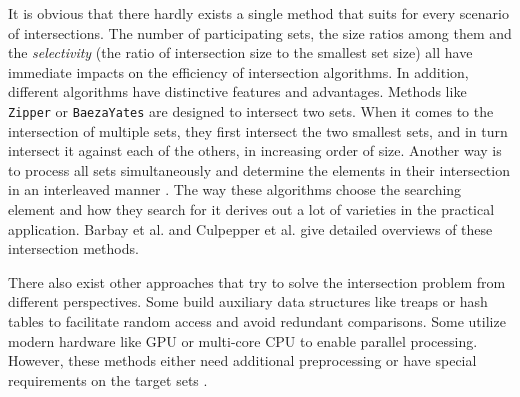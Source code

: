 It is obvious that there hardly exists a single method that suits for every scenario of intersections.
The number of participating sets, the size ratios among them and the \textit{selectivity} (the ratio of intersection size to the smallest set size) all have immediate impacts on the efficiency of intersection algorithms.
In addition, different algorithms have distinctive features and advantages.
Methods like \texttt{Zipper} or \texttt{BaezaYates} \cite{Baeza2010Fast} are designed to intersect two sets.
When it comes to the intersection of multiple sets, they first intersect the two smallest sets, and in turn intersect it against each of the others, in increasing order of size.
Another way is to process all sets simultaneously and determine the elements in their intersection in an interleaved manner \cite{Culpepper2007Compact}.
The way these algorithms choose the searching element and how they search for it derives out a lot of varieties in the practical application.
Barbay et al. \cite{barbay2009experimental} and Culpepper et al. \cite{culpepper2010efficient} give detailed overviews of these intersection methods.

There also exist other approaches that try to solve the intersection problem from different perspectives.
Some build auxiliary data structures like treaps or hash tables \cite{sanders2007intersection,ding2011fast} to facilitate random access and avoid redundant comparisons.
Some utilize modern hardware like GPU or multi-core CPU to enable parallel processing.
However, these methods either need additional preprocessing or have special requirements on the target sets \cite{inoue2014faster}.

